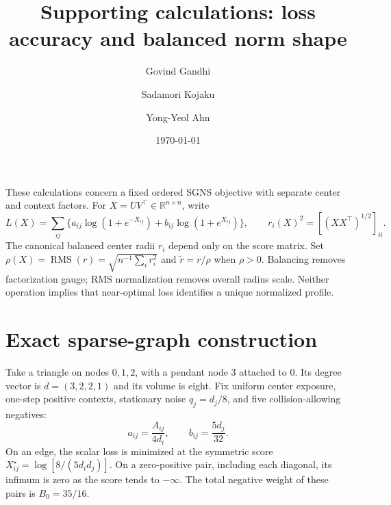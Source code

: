 \documentclass[aps,pre,onecolumn,10pt,superscriptaddress]{revtex4-2}
\newcommand{\RMS}{\operatorname{RMS}}
\begin{document}
\title{Supporting calculations: loss accuracy and balanced norm shape}
\author{Govind Gandhi}
\author{Sadamori Kojaku}
\author{Yong-Yeol Ahn}
\date{\today}
\maketitle

These calculations concern a fixed ordered SGNS objective with separate center and context factors.
For \(X=UV^\top\in\mathbb R^{n\times n}\), write
\begin{equation}
 L(X)=\sum_{ij}\{a_{ij}\log(1+e^{-X_{ij}})+b_{ij}\log(1+e^{X_{ij}})\},
 \qquad r_i(X)^2=[(XX^\top)^{1/2}]_{ii}.
\end{equation}
The canonical balanced center radii \(r_i\) depend only on the score matrix.
Set \(\rho(X)=\RMS(r)=\sqrt{n^{-1}\sum_i r_i^2}\) and \(\widetilde r=r/\rho\) when \(\rho>0\).
Balancing removes factorization gauge; RMS normalization removes overall radius scale.
Neither operation implies that near-optimal loss identifies a unique normalized profile.

\section{Exact sparse-graph construction}

Take a triangle on nodes \(0,1,2\), with a pendant node \(3\) attached to \(0\).
Its degree vector is \(d=(3,2,2,1)\) and its volume is eight.
Fix uniform center exposure, one-step positive contexts, stationary noise \(q_j=d_j/8\), and five collision-allowing negatives:
\begin{equation}
 a_{ij}=\frac{A_{ij}}{4d_i},\qquad b_{ij}=\frac{5d_j}{32}.
\end{equation}
On an edge, the scalar loss is minimized at the symmetric score
\(X_{ij}^\star=\log[8/(5d_id_j)]\).
On a zero-positive pair, including each diagonal, its infimum is zero as the score tends to \(-\infty\).
The total negative weight of these pairs is \(B_0=35/16\).
\end{document}
